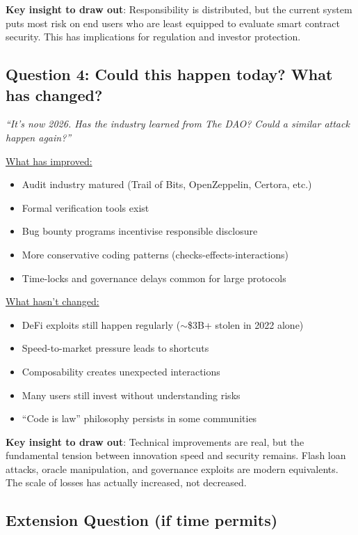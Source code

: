 \documentclass[11pt]{article}
\begin{document}
\medskip
\noindent\textbf{Key insight to draw out}: Responsibility is distributed, but the current system puts most risk on end users who are least equipped to evaluate smart contract security. This has implications for regulation and investor protection.

\subsection*{Question 4: Could this happen today? What has changed?}

\textit{``It's now 2026. Has the industry learned from The DAO? Could a similar attack happen again?''}

\medskip
\noindent\underline{What has improved:}
\begin{itemize}[leftmargin=*]
\item Audit industry matured (Trail of Bits, OpenZeppelin, Certora, etc.)
\item Formal verification tools exist
\item Bug bounty programs incentivise responsible disclosure
\item More conservative coding patterns (checks-effects-interactions)
\item Time-locks and governance delays common for large protocols
\end{itemize}

\medskip
\noindent\underline{What hasn't changed:}
\begin{itemize}[leftmargin=*]
\item DeFi exploits still happen regularly ($\sim$\$3B+ stolen in 2022 alone)
\item Speed-to-market pressure leads to shortcuts
\item Composability creates unexpected interactions
\item Many users still invest without understanding risks
\item ``Code is law'' philosophy persists in some communities
\end{itemize}

\medskip
\noindent\textbf{Key insight to draw out}: Technical improvements are real, but the fundamental tension between innovation speed and security remains. Flash loan attacks, oracle manipulation, and governance exploits are modern equivalents. The scale of losses has actually increased, not decreased.

\subsection*{Extension Question (if time permits)}
\end{document}
